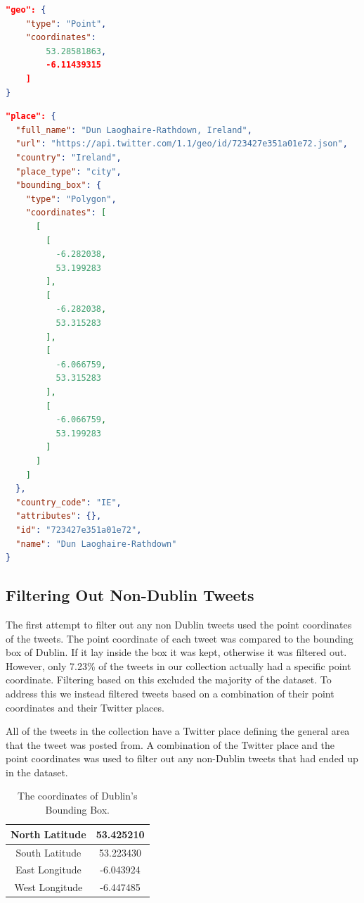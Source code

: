 \begin{lstlisting}[caption={Geo-tagged Tweet with Point Coordinate},
captionpos=b,label=lst:pointjson,language=json,firstnumber=1]
"geo": {
    "type": "Point",
    "coordinates": 
        53.28581863,
        -6.11439315
    ]
}
\end{lstlisting}

\begin{lstlisting}[caption={Geo-tagged Tweet with Twitter Place},captionpos=b,label=lst:placejson,language=json,firstnumber=1]
"place": {
  "full_name": "Dun Laoghaire-Rathdown, Ireland",
  "url": "https://api.twitter.com/1.1/geo/id/723427e351a01e72.json",
  "country": "Ireland",
  "place_type": "city",
  "bounding_box": {
    "type": "Polygon",
    "coordinates": [
      [
        [
          -6.282038,
          53.199283
        ],
        [
          -6.282038,
          53.315283
        ],
        [
          -6.066759,
          53.315283
        ],
        [
          -6.066759,
          53.199283
        ]
      ]
    ]
  },
  "country_code": "IE",
  "attributes": {},
  "id": "723427e351a01e72",
  "name": "Dun Laoghaire-Rathdown"
}
\end{lstlisting}

\subsection*{Filtering Out Non-Dublin Tweets}

The first attempt to filter out any non Dublin tweets used the point coordinates of the tweets. The point coordinate of each tweet was compared to the bounding box of Dublin. If it lay inside the box it was kept, otherwise it was filtered out. However, only 7.23\% of the tweets in our collection actually had a specific point coordinate. Filtering based on this excluded the majority of the dataset. To address this we instead filtered tweets based on a combination of their point coordinates and their Twitter places.

All of the tweets in the collection have a Twitter place defining the general area that the tweet was posted from. A combination of the Twitter place and the point coordinates was used to filter out any non-Dublin tweets that had ended up in the dataset. 

\begin{table}[h!]
\caption{The coordinates of Dublin's Bounding Box.}
\label{tab:dublinbb}
\setlength\extrarowheight{5pt}
\begin{tabular}{|c|c|}
\hline
North Latitude  & 53.425210 \\ \hline
South Latitude  & 53.223430 \\ \hline
East Longitude & -6.043924 \\ \hline
West Longitude & -6.447485 \\ \hline
\end{tabular}
\end{table}


